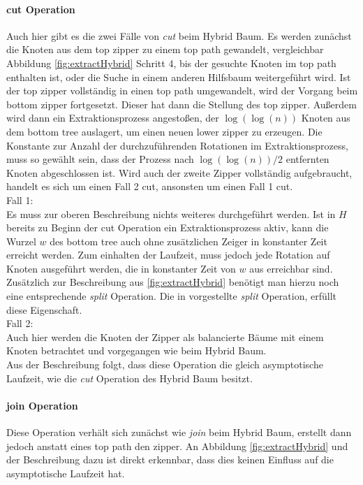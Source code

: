 \documentclass[a4paper,12pt]{article}
\begin{document}
\paragraph{cut Operation}
Auch hier gibt es die zwei Fälle von \textit{cut} beim Hybrid Baum. Es werden zunächst die Knoten aus dem top zipper zu einem top path gewandelt, vergleichbar Abbildung \ref{fig:extractHybrid} Schritt 4, bis der gesuchte Knoten im top path enthalten ist, oder die Suche in einem anderen Hilfsbaum weitergeführt wird. Ist der top zipper vollständig in einen top path umgewandelt, wird der Vorgang beim bottom zipper fortgesetzt. Dieser hat dann die Stellung des top zipper. Außerdem wird dann ein Extraktionsprozess angestoßen, der $\log\left(\log\left(n\right)\right)$ Knoten aus dem bottom tree auslagert, um einen neuen lower zipper zu erzeugen. Die Konstante zur Anzahl der durchzuführenden Rotationen im Extraktionsprozess, muss so gewählt sein, dass der Prozess nach $\log\left(\log\left(n\right)\right) / 2$ entfernten Knoten abgeschlossen ist. Wird auch der zweite Zipper vollständig aufgebraucht, handelt es sich um einen Fall 2 cut, ansonsten um einen Fall 1 cut.\\
Fall 1:\\
Es muss zur oberen Beschreibung nichts weiteres durchgeführt werden. Ist in $H$ bereits zu Beginn der cut Operation ein Extraktionsprozess aktiv, kann die Wurzel $w$ des bottom tree auch ohne zusätzlichen Zeiger in konstanter Zeit erreicht werden. Zum einhalten der Laufzeit, muss jedoch jede Rotation auf Knoten ausgeführt werden, die in konstanter Zeit von $w$ aus erreichbar sind. Zusätzlich zur Beschreibung aus \ref{fig:extractHybrid} benötigt man hierzu noch eine entsprechende \textit{split} Operation. Die in \cite{zipper} vorgestellte \textit{split} Operation, erfüllt diese Eigenschaft.\\
Fall 2:\\
Auch hier werden die Knoten der Zipper als balancierte Bäume mit einem Knoten betrachtet und vorgegangen wie beim Hybrid Baum.\\
Aus der Beschreibung folgt, dass diese Operation die gleich asymptotische Laufzeit, wie die \textit{cut} Operation des Hybrid Baum besitzt. 


  

\paragraph{join Operation}
Diese Operation verhält sich zunächst wie \textit{join} beim Hybrid Baum, erstellt dann jedoch anstatt eines top path den zipper. An Abbildung \ref{fig:extractHybrid} und der Beschreibung dazu ist direkt erkennbar, dass dies keinen Einfluss auf die asymptotische Laufzeit hat.   
\end{document}
